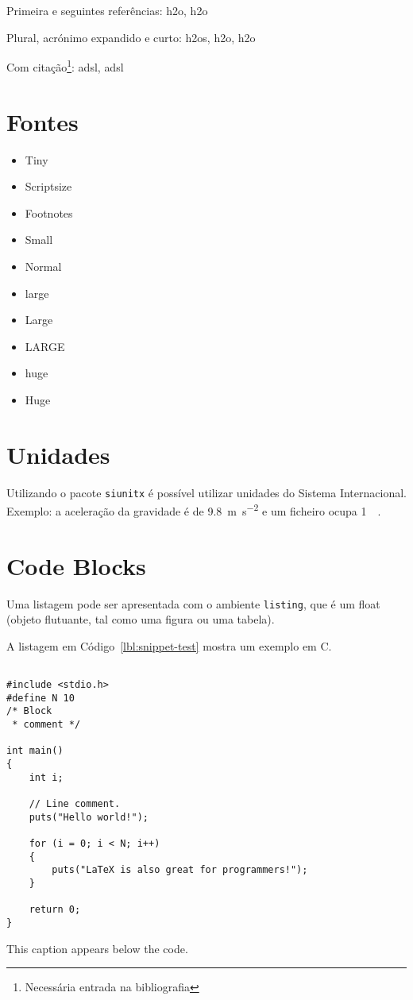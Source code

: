 Primeira e seguintes referências: \ac{h2o}, \ac{h2o}

Plural, acrónimo expandido e curto: \acp{h2o}, \acl{h2o}, \acs{h2o}

Com citação\footnote{Necessária entrada na bibliografia}: \ac{adsl}, \ac{adsl}


\section{Fontes}

\begin{itemize}
\item{\tiny Tiny}
\item{\scriptsize Scriptsize}
\item{\footnotesize Footnotes}
\item{\small Small}
\item{\normalsize Normal}
\item{\large large}
\item{\Large Large}
\item{\LARGE LARGE}
\item{\huge huge}
\item{\Huge Huge}
\end{itemize}

\section{Unidades}

Utilizando o pacote \verb|siunitx| é possível utilizar unidades do Sistema Internacional. Exemplo: a aceleração da gravidade é de \SI{9.8}{\metre\per\second\squared} e um ficheiro ocupa \SI{1}{\mebi\byte}. 

\section{Code Blocks}
Uma listagem pode ser apresentada com o ambiente \texttt{listing}, que é um float (objeto flutuante, tal como uma figura ou uma tabela).

A listagem em Código~\ref{lbl:snippet-test} mostra um exemplo em C.

\begin{listing}[h]
\begin{verbatim}

#include <stdio.h>
#define N 10
/* Block
 * comment */
 
int main()
{
    int i;
 
    // Line comment.
    puts("Hello world!");
 
    for (i = 0; i < N; i++)
    {
        puts("LaTeX is also great for programmers!");
    }
 
    return 0;
}
\end{verbatim}
\caption{This caption appears below the code.}
\label{lbl:snippet-test}
\end{listing}

